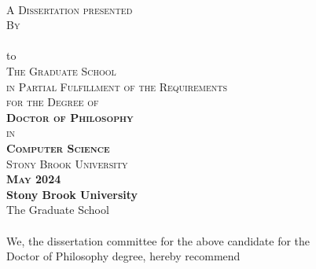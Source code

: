 \begin{center}
    
    \thispagestyle{empty}
    {\large \textsc{\textbf{\ttitle}}}  \\
    \vspace{0.9cm}
    \textsc{A Dissertation presented}  \\
    \vspace{0.45cm}
    \textsc{By}  \\
    \vspace{0.45cm}
    {\large \textsc{\textbf{\authorname}}}  \\
    \vspace{0.9cm}
    to  \\
    \vspace{0.45cm}
    \textsc{The Graduate School}  \\
    \vspace{0.45cm}
    \textsc{in Partial Fulfillment of the Requirements}  \\
    \vspace{0.45cm}
    \textsc{for the Degree of}  \\
    \vspace{0.45cm}
    \textsc{\textbf{Doctor of Philosophy}}  \\
    \vspace{0.45cm}
    \textsc{in}  \\
    \vspace{0.45cm}
    \textsc{\textbf{Computer Science}}  \\
    \vspace{1.2cm}
    \textsc{Stony Brook University}  \\
    \vspace{1.2cm}
    \textsc{\textbf{May 2024}}  \\
    \eject 
    \setcounter{page}{2}
    {\large \textbf{Stony Brook University}}  \\
    \vspace{0.25cm}
    The Graduate School  \\
    \vspace{0.5cm}
    \textbf{\authorname}  \\
    \vspace{0.5cm}
    {We}, the dissertation committee for the above candidate for the  \\
    \vspace{0.25cm}
    Doctor of Philosophy degree, hereby recommend  \\

\end{center}
